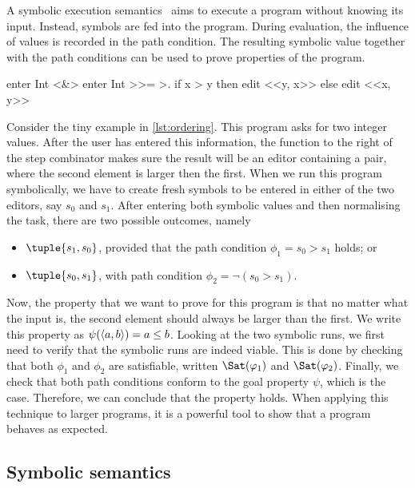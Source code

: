A symbolic execution semantics~\cite{King1975,Boyer1975} aims to execute a program without knowing its input.
Instead, symbols are fed into the program.
During evaluation, the influence of values is recorded in the path condition.
The resulting symbolic value together with the path conditions can be used to prove properties of the program.

\begin{TASK}[
    float=ht,
    caption={Ordering of tuple elements.},
    captionpos=b,
    label=lst:ordering]
  enter Int <&> enter Int >>= >. if x > y then edit <<y, x>> else edit <<x, y>>
\end{TASK}

Consider the tiny example in \cref{lst:ordering}.
This program asks for two integer values.
After the user has entered this information, the function to the right of the step combinator makes sure the result will be an editor containing a pair,
where the second element is larger then the first.
When we run this program symbolically, we have to create fresh symbols to be entered in either of the two editors, say $s_0$ and $s_1$.
After entering both symbolic values and then normalising the task, there are two possible outcomes, namely
\begin{itemize}
  \item $\tuple{s_1,s_0}$, provided that the path condition $\phi_1 = s_0 > s_1$ holds; or
  \item $\tuple{s_0,s_1}$, with path condition $\phi_2 = \lnot (s_0 > s_1)$.
\end{itemize}

Now, the property that we want to prove for this program is that no matter what the input is, the second element should always be larger than the first.
We write this property as $\psi(\langle a, b\rangle)= a \leq b$.
Looking at the two symbolic runs, we first need to verify that the symbolic runs are indeed viable.
This is done by checking that both $\phi_1$ and $\phi_2$ are satisfiable, written $\Sat(\phi_1)$ and $\Sat(\phi_2)$.
Finally, we check that both path conditions conform to the goal property $\psi$, which is the case.
Therefore, we can conclude that the property holds.
When applying this technique to larger programs, it is a powerful tool to show that a program behaves as expected.


\subsection{Symbolic semantics}
\label{sub:symbolic-semantics}

